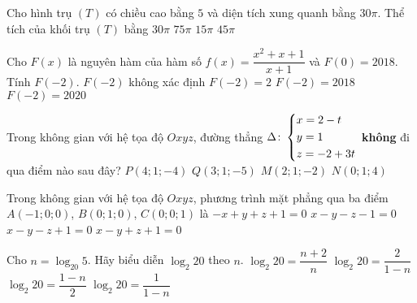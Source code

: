 \begin{ex}%
Cho hình trụ $(T)$ có chiều cao bằng $5$ và diện tích xung quanh bằng $30\pi$. Thể tích của khối trụ $(T)$ bằng
\choice
{$30\pi$}
{$75\pi$}
{$15\pi$}
{\True $45\pi$}
\end{ex}
\begin{ex}%
Cho $F(x)$ là nguyên hàm của hàm số $f(x)=\dfrac{x^2+x+1}{x+1}$ và $F(0)=2018$. Tính $F(-2)$.
\choice
{$F(-2)$ không xác định}
{$F(-2)=2$}
{$F(-2)=2018$}
{\True $F(-2)=2020$}
\end{ex}
\begin{ex}%
Trong không gian với hệ tọa độ $Oxyz$, đường thẳng $\Delta \colon \left\{\begin{aligned}&x=2-t\\&y=1\\&z=-2+3t\end{aligned}\right.$ \textbf{không} đi qua điểm nào sau đây?
\choice
{\True $P(4;1;-4)$}
{$Q(3;1;-5)$}
{$M(2;1;-2)$}
{$N(0;1;4)$}
\end{ex}
\begin{ex}%
Trong không gian với hệ tọa độ $Oxyz$, phương trình mặt phẳng qua ba điểm $A(-1;0;0)$, $B(0;1;0)$, $ C(0;0;1)$ là
\choice
{$-x+y+z+1=0$}
{$x-y-z-1=0$}
{\True $x-y-z+1=0$}
{$x-y+z+1=0$}
\end{ex}
\begin{ex}%
Cho $n=\log _{20}5$. Hãy biểu diễn $\log _{2}{20}$ theo $n$.
\choice
{$\log _{2}{20}=\dfrac{n+2}{n}$}
{\True $\log _{2}{20}=\dfrac{2}{1-n}$}
{$\log _{2}{20}=\dfrac{1-n}{2}$}
{$\log _{2}{20}=\dfrac{1}{1-n}$}
\end{ex}
